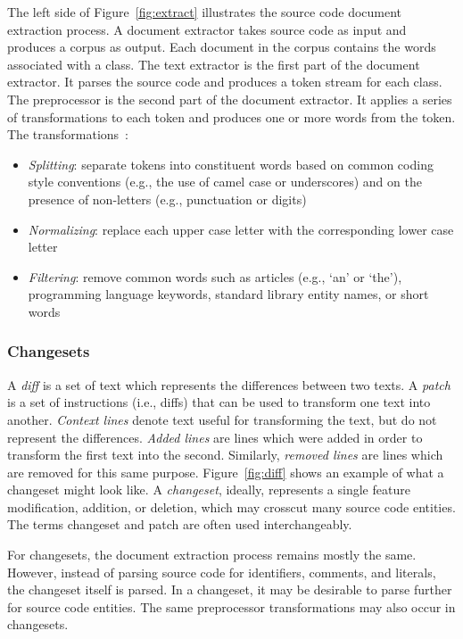 The left side of Figure~\ref{fig:extract} illustrates the source code document extraction process.
A document extractor takes source code as input and produces a corpus as output.
Each document in the corpus contains the words associated with a class.
The text extractor is the first part of the document extractor.
It parses the source code and produces a token stream for each class.
The preprocessor is the second part of the document extractor.
It applies a series of transformations to each token and
produces one or more words from the token.
The transformations~\cite{Marcus-etal:2004,Marcus-Menzies:2010}: %
\begin{itemize}
    \item {\it Splitting}: separate tokens into constituent words
        based on common coding style conventions (e.g., the use of camel case or underscores)
        and on the presence of non-letters (e.g., punctuation or digits)
    \item {\it Normalizing}: replace each upper case letter with the corresponding
        lower case letter
    \item {\it Filtering}: remove common words such as articles (e.g., `an' or `the'),
        programming language keywords, standard library entity names, or short words
\end{itemize}


\subsubsection{Changesets}

A \textit{diff} is a set of text which represents the differences between two texts.
A \textit{patch} is a set of instructions (i.e., diffs) that can be used to transform one text into another.
\textit{Context lines} denote text useful for transforming the text, but do not represent the differences.
\textit{Added lines} are lines which were added in order to transform the first text into the second.
Similarly, \textit{removed lines} are lines which are removed for this same purpose.
Figure~\ref{fig:diff} shows an example of what a changeset might look like.
A \textit{changeset}, ideally, represents a single feature modification, addition, or deletion, which may crosscut many source code entities.
The terms changeset and patch are often used interchangeably.

For changesets, the document extraction process remains mostly the same.
However, instead of parsing source code for identifiers, comments, and literals, the changeset itself is parsed.
In a changeset, it may be desirable to parse further for source code entities.
The same preprocessor transformations may also occur in changesets.


